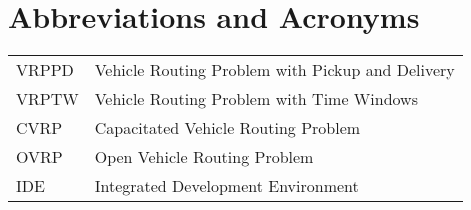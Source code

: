 \chapter*{Abbreviations and Acronyms}


\noindent
\begin{longtable}{@{}p{}p{}@{}}
VRPPD & Vehicle Routing Problem with Pickup and Delivery \\
VRPTW & Vehicle Routing Problem with Time Windows \\ 
CVRP & Capacitated Vehicle Routing Problem \\ 
OVRP & Open Vehicle Routing Problem \\
IDE & Integrated Development Environment

\end{longtable}
